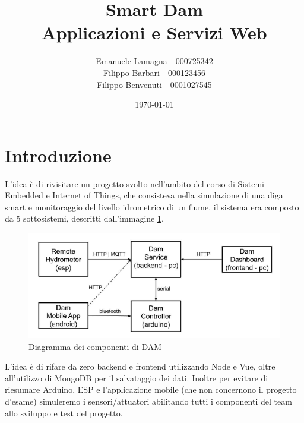 \documentclass{report}
\title{
    Smart Dam \\
    \large Applicazioni e Servizi Web
}
\author{\href{mailto:emalama@studio.unibo.it}{Emanuele Lamagna} - 000725342\\\href{mailto:filippo.barbari@studio.unibo.it}{Filippo Barbari} - 000123456\\\href{mailto:filippo.benvenuti3@studio.unibo.it}{Filippo Benvenuti} - 0001027545}
\date{\today}
\begin{document}
\maketitle
\section{Introduzione}\label{sec:intro}
L'idea è di rivisitare un progetto svolto nell'ambito del corso di Sistemi Embedded e Internet of Things, che consisteva nella simulazione di una diga smart e monitoraggio del livello idrometrico di un fiume. il sistema era composto da 5 sottosistemi, descritti dall'immagine \ref{fig:dam-scheme}.
\begin{figure}[h!]
	\centering
	\includegraphics[scale=0.7]{dam-scheme.png}
	\caption{Diagramma dei componenti di DAM}
	\label{fig:dam-scheme}
\end{figure}
L'idea è di rifare da zero backend e frontend utilizzando Node e Vue, oltre all'utilizzo di MongoDB per il salvataggio dei dati. Inoltre per evitare di riesumare Arduino, ESP e l'applicazione mobile (che non concernono il progetto d'esame) simuleremo i sensori/attuatori abilitando tutti i componenti del team allo sviluppo e test del progetto.
\end{document}
